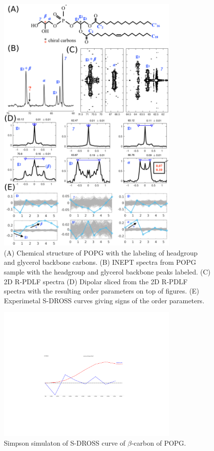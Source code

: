 \documentclass[journal=jpcbfk]{achemso}
\begin{document}
\begin{figure}[]
  \includegraphics[width=0.8\textwidth]{./Figs/PGexpRPDLF.eps}
  \caption{\label{POPGspectra}
    (A) Chemical structure of POPG with the labeling of headgroup and glycerol backbone carbons.
    (B) INEPT spectra from POPG sample with the headgroup and glycerol backbone peaks labeled.
    (C) 2D R-PDLF spectra
    (D) Dipolar sliced from the  2D R-PDLF spectra with the resulting order parameters on top of figures.
    (E) Experimetal S-DROSS curves giving signs of the order parameters.
  }
\end{figure}

\begin{figure}[]
  \includegraphics[width=0.8\textwidth]{./Figs/SIMPSON.pdf}
  \caption{\label{POPGsimpson}
    Simpson simulaton of S-DROSS curve of $\beta$-carbon of POPG.
  }
\end{figure}
\end{document}

